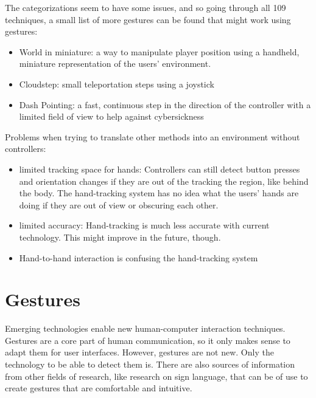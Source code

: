 The categorizations seem to have some issues, and so going through all
109 techniques, a small list of more gestures can be found that might work using gestures:

\begin{itemize}
\itemsep1pt\parskip0pt
\item
  World in miniature: a way to manipulate player position using a handheld, miniature representation of the users' environment. \cite{Englmeier}
\item
  Cloudstep: small teleportation steps using a joystick
\item
  Dash Pointing: a fast, continuous step in the direction of the controller with a limited field of view to help against cybersickness
\end{itemize}


Problems when trying to translate other methods into an environment without controllers:

\begin{itemize}
\item
  limited tracking space for hands: Controllers can still detect button
  presses and orientation changes if they are out of the tracking
  the region, like behind the body. The hand-tracking system has no idea
  what the users' hands are doing if they are out of view or obscuring
  each other.\\
\item
  limited accuracy: Hand-tracking is much less accurate with current
  technology. This might improve in the future, though.\\
\item
  Hand-to-hand interaction is confusing the hand-tracking system\\
\end{itemize}

\section{Gestures}\label{gestures}

Emerging technologies enable new human-computer interaction techniques. Gestures are a core part of human communication, so it only makes sense to adapt them for user interfaces. However, gestures are not new. Only the technology to be able to detect them is. There are also sources of information from other fields of research, like research on sign language, that can be of use to create gestures that are comfortable and intuitive.


